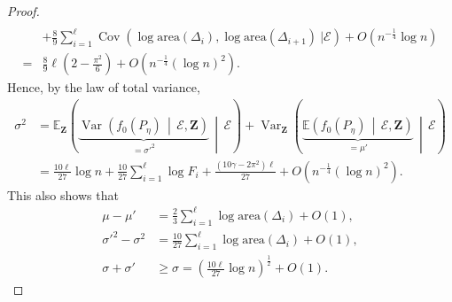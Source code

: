 \documentclass[AHL,Unicode,longabstracts,published]{cedram}
\newcommand{\var}{\operatorname{Var}}
\newcommand{\cov}{\operatorname{Cov}}
\newcommand{\bfZ}{\mathbf{Z}}
\newcommand{\bbE}{\mathbb{E}}
\newcommand{\clE}{\mathcal{E}}
\newcommand{\area}{\mathrm{area}}
\begin{document}
\begin{proof}
\begin{align*}
\\ & +
\frac 89 \sum_{i=1}^\ell \cov \left(\log {\area} (\Delta_i), \log {\area} (\Delta_{i+1}) \ \Big|\clE \right) + O\left(n^{- \frac 14 } \log n\right)
\\ = &
\frac 89 \ell \left(2- \frac{\pi^2}6 \right) + O\left(n^{-\frac 14} (\log n)^2\right).
\end{align*}
Hence, by the law of total variance,
\begin{align*}
\sigma^2 &=\bbE_ {\bfZ}\left(\underbrace{\var \left(f_0(P_{\eta})\,\middle|\,\clE, {\bfZ}\right)}_{= {\sigma '}^2}\, \middle|\, \clE\right) + \var_{\bfZ} \left(\underbrace{\bbE \left(f_0(P_{\eta})\,\middle|\,\clE, {\bfZ}\right)}_{= \mu'}\,\middle|\,\clE\right)\\
&= \frac{10 \ell}{27}\log n +\frac{10}{27}\sum_{i=1}^\ell \log F_i +
\frac{\left(10 \gamma -2 \pi^2\right)\ell }{27} + O\left(n^{-\frac 14} (\log n)^2\right).
\end{align*}
This also shows that
\begin{align}
\mu-\mu'& = \frac{2}{3}\sum_{i=1}^\ell \log{\area}(\Delta_i)+O(1),\label{eq:moments}
\\
\sigma'^2-\sigma^2 & = \frac{10}{27}\sum_{i=1}^\ell \log{\area}(\Delta_i)+O(1),\label{eq:variance1}
\\
\sigma+\sigma'& \geq \sigma = \left(\frac{10 \ell}{27}\log n\right)^{\frac 12} +O(1)\label{eq:variance2}
.
\end{align}


\end{proof}
\end{document}
